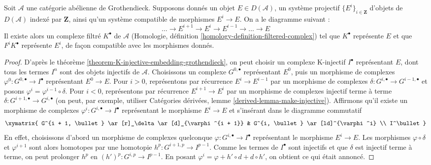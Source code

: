 \begin{lemma}
\label{lemma-represent-by-filtered-complex}
Soit $\mathcal{A}$ une catégorie abélienne de Grothendieck. Supposons donnés
un objet $E \in D(\mathcal{A})$, un système projectif
$\{E^i\}_{i \in \mathbf{Z}}$ d'objets de $D(\mathcal{A})$ indexé par
$\mathbf{Z}$, ainsi qu'un système compatible de morphismes $E^i \to E$.
On a le diagramme suivant :
$$
\ldots \to E^{i + 1} \to E^i \to E^{i - 1} \to \ldots \to E
$$
Il existe alors un complexe filtré $K^\bullet$ de $\mathcal{A}$
(Homologie, définition \ref{homology-definition-filtered-complex}) tel que
$K^\bullet$ représente $E$ et que $F^iK^\bullet$ représente $E^i$, de façon
compatible avec les morphismes donnés.
\end{lemma}

\begin{proof}
D'après le théorème \ref{theorem-K-injective-embedding-grothendieck}, on peut
choisir un complexe K-injectif $I^\bullet$ représentant $E$, dont tous les
termes $I^n$ sont des objets injectifs de $\mathcal{A}$.
Choisissons un complexe $G^{0, \bullet}$ représentant $E^0$, puis un
morphisme de complexes $\varphi^0 : G^{0, \bullet} \to I^\bullet$
représentant $E^0 \to E$.
Pour $i > 0$, représentons par récurrence $E^i \to E^{i - 1}$ par un
morphisme de complexes
$\delta : G^{i, \bullet} \to G^{i - 1, \bullet}$
et posons $\varphi^i = \varphi^{i - 1} \circ \delta$.
Pour $i < 0$, représentons par récurrence $E^{i + 1} \to E^i$ par un
morphisme de complexes injectif terme à terme
$\delta : G^{i + 1, \bullet} \to G^{i, \bullet}$
(on peut, par exemple, utiliser Catégories dérivées, lemme
\ref{derived-lemma-make-injective}).
Affirmons qu'il existe un morphisme de complexes
$\varphi^i : G^{i, \bullet} \to I^\bullet$ représentant le morphisme
$E^i \to E$ et s'insérant dans le diagramme commutatif
$$
\xymatrix{
G^{i + 1, \bullet} \ar[r]_\delta \ar[d]_{\varphi^{i + 1}} &
G^{i, \bullet} \ar[ld]^{\varphi^i} \\
I^\bullet
}
$$
En effet, choisissons d'abord un morphisme de complexes quelconque
$\varphi : G^{i, \bullet} \to I^\bullet$ représentant le morphisme
$E^i \to E$. Les morphismes $\varphi \circ \delta$ et
$\varphi^{i + 1}$ sont alors homotopes par une homotopie
$h^p : G^{i + 1, p} \to I^{p - 1}$. Comme les termes de $I^\bullet$ sont
injectifs et que $\delta$ est injectif terme à terme, on peut prolonger
$h^p$ en $(h')^p : G^{i, p} \to I^{p - 1}$. En posant
$\varphi^i = \varphi + h' \circ d + d \circ h'$, on obtient ce qui était
annoncé.


\end{proof}

